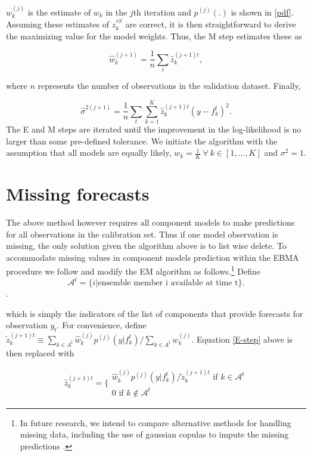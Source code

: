 \documentclass[12pt,fullpage,endnotes]{article}
\begin{document}
$w_k^{(j)}$ is the estimate of $w_k$ in the $j$th iteration and
$p^{(j)}(.)$ is shown in \eqref{pdf}.  Assuming these estimates of
$z_{k}^{s|t}$ are correct, it is then straightforward to derive the
maximizing value for the model weights. Thus, the M step estimates
these as 

\begin{equation}
\label{M-step}
\hat{w}^{(j+1)}_k=\frac{1}{n}\underset{t}{\sum}\hat{z}^{(j+1)t}_{k},
\end{equation}

\noindent where $n$ represents the number of observations in the
validation dataset.  Finally,

\begin{equation}
\label{sigma}
\hat{\sigma}^{2(j+1)}=\frac{1}{n}\underset{t}{\sum}\overset{K}{\underset{k=1}{\sum}}\hat{z}^{(j+1)t}_{k}(y-f_{k}^{t})^2.
\end{equation}
\noindent The E and M steps are iterated until the improvement in the
log-likelihood is no larger than some pre-defined tolerance.  We
initiate the algorithm with the assumption that all models are equally
likely, $w_k = \frac{1}{K} ~ \forall ~ k \in [1, \ldots, K]$ and
$\sigma^2=1$.


\section{Missing forecasts}
\label{missing}
The above method however requires all component models to make predictions for all observations in the calibration set. Thus if one model observation is missing, the only solution given the algorithm above is to list wise delete. To accommodate missing values in component models prediction within the EBMA procedure we follow \citet{Fraley:2010} and modify the EM algorithm as follows.\footnote{In future research, we intend to compare alternative methods for handling missing data, including the use of gaussian copulas to impute the missing predictions \citep{Hoff:2007}.}  Define $$\mathcal{A}^t = \{i|\mbox{ensemble member i available at time t}\}.$$.

\noindent which is simply the indicators of the list of components that provide forecasts for observation $y_t$.   For convenience, define $\tilde{z}_k^{(j+1)t} \equiv {{\underset{k \in A^t}{\sum}}\hat{w}^{(j)}_kp^{(j)}(y|f_{k}^{t})}/{\underset{k \in A^t}\sum w_k^{(j)}}$.  Equation \ref{E-step} above is then replaced with

\begin{equation}
\hat{z}^{(j+1)t}_{k} = \Bigg\{ \begin{array}{c} {\hat{w}^{(j)}_k p^{(j)}(y|f_{k}^{t})}/{\tilde{z}_k^{(j+1)t} } \mbox{ if } k \in \mathcal{A}^t\\ 0 \mbox{ if } k \notin \mathcal{A}^t \end{array}
\end{equation}
\end{document}
